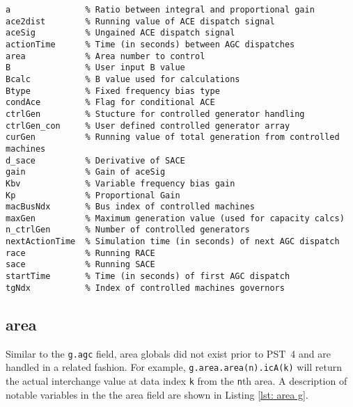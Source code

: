 \begin{lstlisting}[caption={AGC Global Field Variables},label={lst: agc g}]
\end{lstlisting}\vspace{-2 em}
\begin{verbatim}
a               % Ratio between integral and proportional gain
ace2dist        % Running value of ACE dispatch signal
aceSig          % Ungained ACE dispatch signal
actionTime      % Time (in seconds) between AGC dispatches
area            % Area number to control
B               % User input B value
Bcalc           % B value used for calculations
Btype           % Fixed frequency bias type
condAce         % Flag for conditional ACE
ctrlGen         % Stucture for controlled generator handling
ctrlGen_con     % User defined controlled generator array
curGen          % Running value of total generation from controlled machines
d_sace          % Derivative of SACE
gain            % Gain of aceSig
Kbv             % Variable frequency bias gain
Kp              % Proportional Gain
macBusNdx       % Bus index of controlled machines
maxGen          % Maximum generation value (used for capacity calcs)
n_ctrlGen       % Number of controlled generators
nextActionTime  % Simulation time (in seconds) of next AGC dispatch
race            % Running RACE
sace            % Running SACE
startTime       % Time (in seconds) of first AGC dispatch
tgNdx           % Index of controlled machines governors
\end{verbatim}

\pagebreak
\subsection{area} \label{ss: area globals} 
Similar to the \verb|g.agc| field, area globals did not exist prior to \mbox{PST 4} and are handled in a related fashion.
For example, \verb|g.area.area(n).icA(k)| will return the actual interchange value at data index \verb|k| from the \verb|n|th area.
A description of notable variables in the the area field are shown in Listing \ref{lst: area g}.

